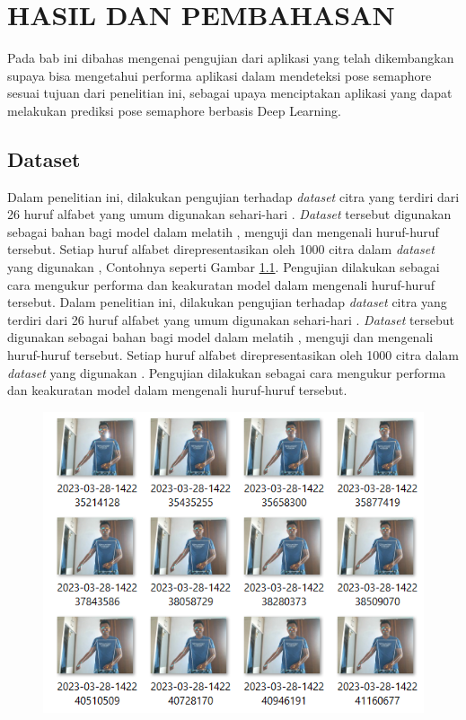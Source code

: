 \chapter{HASIL DAN PEMBAHASAN}
Pada bab ini dibahas mengenai pengujian dari aplikasi yang telah dikembangkan supaya bisa mengetahui performa aplikasi dalam mendeteksi pose semaphore sesuai tujuan dari penelitian ini, sebagai upaya menciptakan aplikasi yang dapat melakukan prediksi pose semaphore berbasis Deep Learning.

\section{Dataset}
Dalam penelitian ini, dilakukan pengujian terhadap \textit{dataset} citra yang terdiri dari 26 huruf alfabet yang umum digunakan sehari-hari . \textit{Dataset} tersebut digunakan sebagai bahan bagi  model dalam  melatih , menguji dan mengenali huruf-huruf tersebut. Setiap huruf alfabet direpresentasikan oleh 1000 citra dalam \textit{dataset} yang digunakan , Contohnya seperti Gambar \ref{fig:Datasetraw}. Pengujian dilakukan sebagai cara mengukur performa dan keakuratan model dalam mengenali huruf-huruf tersebut. Dalam penelitian ini, dilakukan pengujian terhadap \textit{dataset} citra yang terdiri dari 26 huruf alfabet yang umum digunakan sehari-hari . \textit{Dataset} tersebut digunakan sebagai bahan bagi  model dalam  melatih , menguji dan mengenali huruf-huruf tersebut. Setiap huruf alfabet direpresentasikan oleh 1000 citra dalam \textit{dataset} yang digunakan . Pengujian dilakukan sebagai cara mengukur performa dan keakuratan model dalam mengenali huruf-huruf tersebut.

\begin{figure}[!hbt]
	\centering
	\includegraphics[width=0.6\linewidth]{gambar/bener/gambar_udah.png}
	\label{fig:Datasetraw}
\end{figure}

